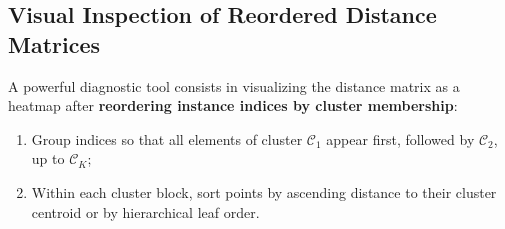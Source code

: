 \subsection{Visual Inspection of Reordered Distance Matrices}
A powerful diagnostic tool consists in visualizing the distance matrix as a heatmap after \textbf{reordering instance indices by cluster membership}:
\begin{enumerate}
    \item Group indices so that all elements of cluster $\mathcal{C}_1$ appear first, followed by $\mathcal{C}_2$, up to $\mathcal{C}_K$;
    \item Within each cluster block, sort points by ascending distance to their cluster centroid or by hierarchical leaf order.
\end{enumerate}

